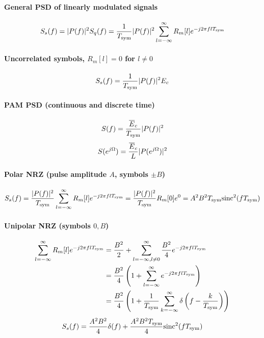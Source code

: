\paragraph{General PSD of linearly modulated signals}
\begin{equation}
S_s(f) = |P(f)|^2 S_q(f) = \frac{1}{{T_{\textrm{sym}}}} |P(f)|^2 \sum_{l=-\infty}^{\infty} R_m[l] e^{-j 2 \pi f l {T_{\textrm{sym}}}}
\label{eq:psd_linecodes}
\end{equation}

\paragraph{Uncorrelated symbols, $R_m[l]=0$ for $l \ne 0$}
\begin{equation}
S_s(f) = \frac{1}{{T_{\textrm{sym}}}} |P(f)|^2 E_c
\label{eq:psd_uncorrelatedLinecodeRepeated}
\end{equation}

\paragraph{PAM PSD (continuous and discrete time)}
\begin{equation}
S(f) = \frac{\overline E_c}{{T_{\textrm{sym}}}} |P(f)|^2
\label{eq:psdPAM}
\end{equation}
\begin{equation}
S(e^{j {\Omega}}) = \frac{\overline E_c}{L}  |P(e^{j {\Omega}})|^2
\end{equation}

\paragraph{Polar NRZ (pulse amplitude $A$, symbols $\pm B$)}
\begin{equation}
S_s(f) = \frac{|P(f)|^2}{{T_{\textrm{sym}}}} \sum_{l=-\infty}^{\infty} R_m[l] e^{-j 2 \pi f l {T_{\textrm{sym}}}} = \frac{|P(f)|^2}{{T_{\textrm{sym}}}} R_m[0] e^{0} = A^2 B^2 {T_{\textrm{sym}}} {\textrm{sinc}}^2(f {T_{\textrm{sym}}})
\label{eq:polarPSD}
\end{equation}

\paragraph{Unipolar NRZ (symbols $0, B$)}
\begin{align}
\sum_{l=-\infty}^{\infty} R_m[l] e^{-j 2 \pi f l {T_{\textrm{sym}}}} &= \frac{B^2}{2} + \sum^{\infty}_{l=-\infty,l \ne 0} \frac{B^2}{4} e^{-j 2 \pi f l {T_{\textrm{sym}}}} \nonumber \\
&= \frac{B^2}{4} \left( 1 + \sum^{\infty}_{l=-\infty} e^{-j 2 \pi f l {T_{\textrm{sym}}}} \right) \nonumber \\
&= \frac{B^2}{4} \left( 1 + \frac{1}{{T_{\textrm{sym}}}} \sum^{\infty}_{k=-\infty} \delta \left( f - \frac{k}{{T_{\textrm{sym}}}} \right) \right)
\label{eq:unipolarPSDParcel}
\end{align}
\[
S_s(f) =  \frac{A^2 B^2} 4 \delta(f) + \frac{A^2 B^2 {T_{\textrm{sym}}}} 4 {\textrm{sinc}}^2(f {T_{\textrm{sym}}})
\]

